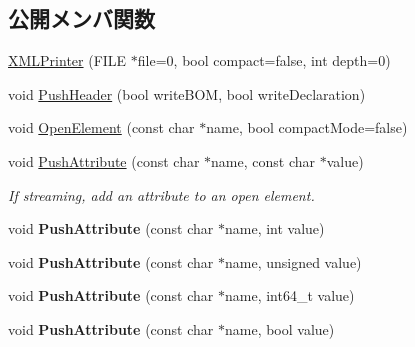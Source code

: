 \subsection*{公開メンバ関数}
\begin{DoxyCompactItemize}
\item 
\hyperlink{classtinyxml2_1_1_x_m_l_printer_aa6d3841c069085f5b8a27bc7103c04f7}{X\+M\+L\+Printer} (F\+I\+LE $\ast$file=0, bool compact=false, int depth=0)
\item 
void \hyperlink{classtinyxml2_1_1_x_m_l_printer_a178c608ce8476043d5d6513819cde903}{Push\+Header} (bool write\+B\+OM, bool write\+Declaration)
\item 
void \hyperlink{classtinyxml2_1_1_x_m_l_printer_a20fb06c83bd13e5140d7dd13af06c010}{Open\+Element} (const char $\ast$name, bool compact\+Mode=false)
\item 
\mbox{\label{classtinyxml2_1_1_x_m_l_printer_a9a4e2c9348b42e147629d5a99f4af3f0}} 
void \hyperlink{classtinyxml2_1_1_x_m_l_printer_a9a4e2c9348b42e147629d5a99f4af3f0}{Push\+Attribute} (const char $\ast$name, const char $\ast$value)
\begin{DoxyCompactList}\small\item\em If streaming, add an attribute to an open element. \end{DoxyCompactList}\item 
\mbox{\label{classtinyxml2_1_1_x_m_l_printer_a69120c82088597372d28d0a98f2ee7a1}} 
void {\bfseries Push\+Attribute} (const char $\ast$name, int value)
\item 
\mbox{\label{classtinyxml2_1_1_x_m_l_printer_aa41039e51990aaf5342f3e0575a692c4}} 
void {\bfseries Push\+Attribute} (const char $\ast$name, unsigned value)
\item 
\mbox{\label{classtinyxml2_1_1_x_m_l_printer_a9bc2fe21a83a70e6aa0415f2034ecbff}} 
void {\bfseries Push\+Attribute} (const char $\ast$name, int64\+\_\+t value)
\item 
\mbox{\label{classtinyxml2_1_1_x_m_l_printer_a51f7950d7b7a19f0d3a0d549a318d45f}} 
void {\bfseries Push\+Attribute} (const char $\ast$name, bool value)
\item 
\mbox{\label{classtinyxml2_1_1_x_m_l_printer_a1714867af40e68ca404c3e84b6cac2a6}} 

\end{DoxyCompactItemize}
